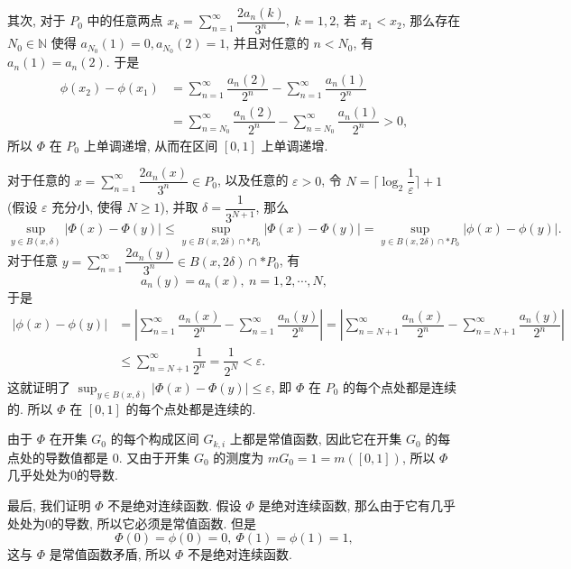 \begin{solution}
\begin{enumerate}
    其次, 对于 \(P_0\) 中的任意两点 \(x_k = \displaystyle \sum\limits_{n=1}^{\infty} \dfrac{2a_n(k)}{3^n}, ~ k = 1, 2\), 若 \(x_1 < x_2\), 那么存在 \(N_0 \in \mathbb{N}\) 使得 \(a_{N_0}(1) = 0, a_{N_0}(2) = 1\), 并且对任意的 \(n < N_0\), 有 \(a_n(1) = a_n(2)\). 于是
    \[\begin{aligned}
    \phi(x_2) - \phi(x_1) & = \sum\limits_{n=1}^{\infty} \dfrac{a_n(2)}{2^n} - \sum\limits_{n=1}^{\infty} \dfrac{a_n(1)}{2^n} \\
    & = \sum\limits_{n=N_0}^{\infty} \dfrac{a_n(2)}{2^n} - \sum\limits_{n=N_0}^{\infty} \dfrac{a_n(1)}{2^n} > 0,
    \end{aligned}\]
    所以 \(\Phi\) 在 \(P_0\) 上单调递增, 从而在区间 \([0, 1]\) 上单调递增.

    对于任意的 \(\displaystyle x = \sum\limits_{n=1}^{\infty} \dfrac{2a_n(x)}{3^n} \in P_0\), 以及任意的 \(\varepsilon > 0\), 令 \(N = \lceil \log_2 \dfrac{1}{\varepsilon} \rceil + 1\) (假设 \(\varepsilon\) 充分小, 使得 \(N \geqslant 1\)), 并取 \(\delta = \dfrac{1}{3^{N+1}}\), 那么
    \[\sup_{y \in B(x, \delta)} \lvert \Phi(x) - \Phi(y) \rvert \leqslant \sup_{y \in B(x, 2\delta) \cap* P_0} \lvert \Phi(x) - \Phi(y) \rvert = \sup_{y \in B(x, 2\delta) \cap* P_0} \lvert \phi(x) - \phi(y) \rvert.\]
    对于任意 \(\displaystyle y = \sum\limits_{n=1}^{\infty} \dfrac{2a_n(y)}{3^n} \in B(x, 2\delta) \cap* P_0\), 有
    \[a_n(y) = a_n(x), ~ n = 1, 2, \cdots, N,\]
    于是
    \[\begin{aligned}
    \lvert \phi(x) - \phi(y) \rvert & = \left\lvert \sum\limits_{n=1}^{\infty} \dfrac{a_n(x)}{2^n} - \sum\limits_{n=1}^{\infty} \dfrac{a_n(y)}{2^n} \right\rvert = \left\lvert \sum\limits_{n=N+1}^{\infty} \dfrac{a_n(x)}{2^n} - \sum\limits_{n=N+1}^{\infty} \dfrac{a_n(y)}{2^n} \right\rvert \\
    & \leqslant \sum\limits_{n=N+1}^{\infty} \dfrac{1}{2^n} = \dfrac{1}{2^{N}} < \varepsilon.
    \end{aligned}\]
    这就证明了 \(\displaystyle \sup_{y \in B(x, \delta)} \lvert \Phi(x) - \Phi(y) \rvert \leqslant \varepsilon\), 即 \(\Phi\) 在 \(P_0\) 的每个点处都是连续的. 所以 \(\Phi\) 在 \([0, 1]\) 的每个点处都是连续的.

    由于 \(\Phi\) 在开集 \(G_0\) 的每个构成区间 \(G_{k, i}\) 上都是常值函数, 因此它在开集 \(G_0\) 的每点处的导数值都是 \(0\). 又由于开集 \(G_0\) 的测度为 \(m G_0 = 1 = m ([0, 1])\), 所以 \(\Phi\) 几乎处处为0的导数.

    最后, 我们证明 \(\Phi\) 不是绝对连续函数. 假设 \(\Phi\) 是绝对连续函数, 那么由于它有几乎处处为0的导数, 所以它必须是常值函数. 但是
    \[\Phi(0) = \phi(0) = 0, ~ \Phi(1) = \phi(1) = 1,\]
    这与 \(\Phi\) 是常值函数矛盾, 所以 \(\Phi\) 不是绝对连续函数.


\end{enumerate}
\end{solution}
